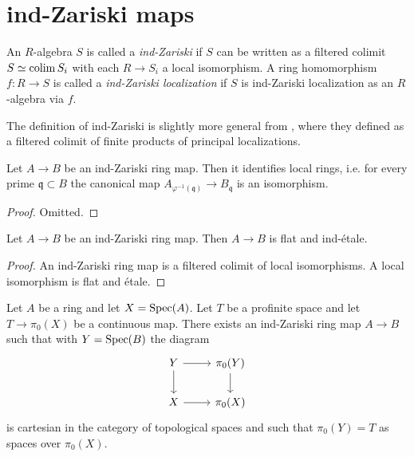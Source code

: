 \section{ind-Zariski maps}

\begin{definition}
    \label{def:ind-Zariski}

    An $R$-algebra $S$ is called a \emph{ind-Zariski} if $S$ can be written as a filtered colimit $S \simeq \operatorname{colim} S_i$ with each $R \to S_i$ a local isomorphism. A ring homomorphism $f : R \to S$ is called a \emph{ind-Zariski localization} if $S$ is ind-Zariski localization as an $R$-algebra via $f$.

\end{definition}

\begin{remark}
  The definition of ind-Zariski is slightly more general from \cite[Definition 2.2.1(iv)]{proetale}, where they defined as a filtered colimit of finite products of principal localizations. 
\end{remark}

\begin{lemma}
  Let $A \to B$ be an ind-Zariski ring map. Then it identifies local rings, i.e. for every prime $\mathfrak{q} \subset B$ the canonical map $A_{\varphi^{-1}(\mathfrak{q})} \to B_{\mathfrak{q}}$ is an isomorphism.
  \label{thm:ind-Zariski-identifies-local-rings}
\end{lemma}

\begin{proof}
  Omitted.
\end{proof}

\begin{lemma}
  Let $A \to B$ be an ind-Zariski ring map. Then $A \to B$ is flat and ind-étale.
  \label{thm:ind-Zariski-is-flat-ind-etale}
\end{lemma}

\begin{proof}
  An ind-Zariski ring map is a filtered colimit of local isomorphisms. A local isomorphism is flat and étale.
\end{proof}

\begin{lemma}
Let $A$ be a ring and let $X = \operatorname{Spec} (A)$. Let $T$ be a profinite space and let $T \to \pi_0(X)$ be a continuous map. There exists an ind-Zariski ring map $A \to B$ such that with $Y = \operatorname{Spec} (B)$ the diagram
\[
\begin{tikzcd}
Y \arrow[r] \arrow[d] & \pi_0(Y) \arrow[d] \\
X \arrow[r] & \pi_0(X)
\end{tikzcd}
\]
is cartesian in the category of topological spaces and such that $\pi_0(Y) = T$ as spaces over $\pi_0(X)$.
\label{thm:exists-ind-Zariski-cartesian}
\end{lemma}

